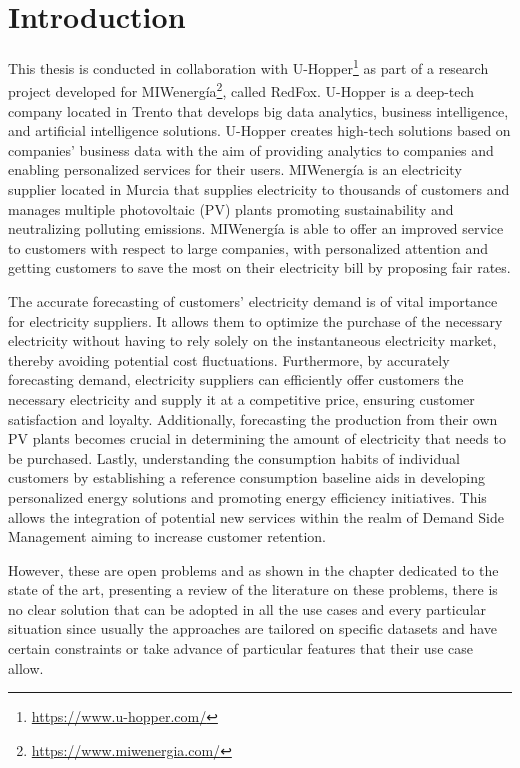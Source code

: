 \chapter{Introduction}
\label{cha:intro}
\vspace{0.4 cm}

This thesis is conducted in collaboration with U-Hopper\footnote{ \url{https://www.u-hopper.com/} } as part of a research project developed for MIWenergía\footnote{ \url{https://www.miwenergia.com/} }, called RedFox.
U-Hopper is a deep-tech company located in Trento that develops big data analytics, business intelligence, and artificial intelligence solutions.
U-Hopper creates high-tech solutions based on companies' business data with the aim of providing analytics to companies and enabling personalized services for their users.
MIWenergía is an electricity supplier located in Murcia that supplies electricity to thousands of customers and manages multiple photovoltaic (PV) plants promoting sustainability and neutralizing polluting emissions.
MIWenergía is able to offer an improved service to customers with respect to large companies, with personalized attention and getting customers to save the most on their electricity bill by proposing fair rates.


The accurate forecasting of customers' electricity demand is of vital importance for electricity suppliers.
It allows them to optimize the purchase of the necessary electricity without having to rely solely on the instantaneous electricity market, thereby avoiding potential cost fluctuations.
Furthermore, by accurately forecasting demand, electricity suppliers can efficiently offer customers the necessary electricity and supply it at a competitive price, ensuring customer satisfaction and loyalty.
Additionally, forecasting the production from their own PV plants becomes crucial in determining the amount of electricity that needs to be purchased.
Lastly, understanding the consumption habits of individual customers by establishing a reference consumption baseline aids in developing personalized energy solutions and promoting energy efficiency initiatives.
This allows the integration of potential new services within the realm of Demand Side Management aiming to increase customer retention.

However, these are open problems and as shown in the chapter dedicated to the state of the art, presenting a review of the literature on these problems, there is no clear solution that can be adopted in all the use cases and every particular situation since usually the approaches are tailored on specific datasets and have certain constraints or take advance of particular features that their use case allow.


